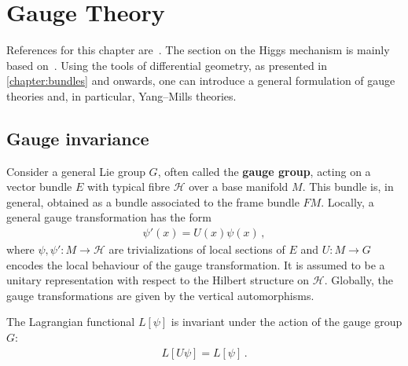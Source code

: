 \chapter{Gauge Theory}\label{chapter:gauge_theory}

    References for this chapter are~\citet{sontz_principal_2015,schuller_lectures_2016,nash_topology_2011,belgun_gauge_2024}. The section on the Higgs mechanism is mainly based on~\citet{choquet-bruhat_analysis_2000}. Using the tools of differential geometry, as presented in \cref{chapter:bundles} and onwards, one can introduce a general formulation of gauge theories and, in particular, Yang--Mills theories.

    \minitoc

\section{Gauge invariance}

    Consider a general Lie group $G$, often called the \textbf{gauge group}, acting on a vector bundle $E$ with typical fibre $\mathcal{H}$ over a base manifold $M$. This bundle is, in general, obtained as a bundle associated to the frame bundle $FM$. Locally, a general gauge transformation has the form
    \begin{gather}
        \label{gauge:gauge_transformation}
        \psi'(x) = U(x)\psi(x)\,,
    \end{gather}
    where $\psi,\psi':M\rightarrow\mathcal{H}$ are trivializations of local sections of $E$ and $U:M\rightarrow G$ encodes the local behaviour of the gauge transformation. It is assumed to be a unitary representation with respect to the Hilbert structure on $\mathcal{H}$. Globally, the gauge transformations are given by the vertical automorphisms.

    \begin{axiom}
        The Lagrangian functional $L[\psi]$ is invariant under the action of the gauge group $G$:
        \begin{gather}
            L[U\psi] = L[\psi]\,.
        \end{gather}
    \end{axiom}

